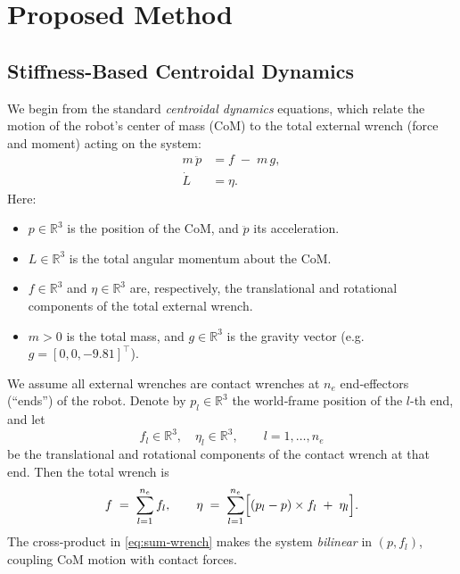 \documentclass[main.tex]{subfiles}
\begin{document}
\section{Proposed Method}\label{sec:proposedmethods}
\subsection{Stiffness-Based Centroidal Dynamics}

We begin from the standard \emph{centroidal dynamics} equations, which relate the motion of the robot’s center of mass (CoM) to the total external wrench (force and moment) acting on the system:
\begin{subequations}\label{eq:centroidal‐dynamics}
\begin{align}
m\,\ddot p &= f \;-\; m\,g, \label{eq:centroidal‐dynamics:trans}\\
\dot L     &= \eta.      \label{eq:centroidal‐dynamics:rot}
\end{align}
\end{subequations}
Here:
\begin{itemize}
  \item $p\in\mathbb{R}^3$ is the position of the CoM, and $\ddot p$ its acceleration.
  \item $L\in\mathbb{R}^3$ is the total angular momentum about the CoM.
  \item $f\in\mathbb{R}^3$ and $\eta\in\mathbb{R}^3$ are, respectively, the translational and rotational components of the total external wrench.
  \item $m>0$ is the total mass, and $g\in\mathbb{R}^3$ is the gravity vector (e.g.\ $g=[0,0,-9.81]^\top$).
\end{itemize}

We assume all external wrenches are contact wrenches at $n_e$ end‐effectors (``ends'') of the robot.  Denote by $p_l\in\mathbb{R}^3$ the world‐frame position of the $l$-th end, and let
\[
f_l\in\mathbb{R}^3,\quad
\eta_l\in\mathbb{R}^3,\qquad l=1,\dots,n_e
\]
be the translational and rotational components of the contact wrench at that end.  Then the total wrench is
\begin{equation}\label{eq:sum‐wrench}
f    \;=\;\sum_{l=1}^{n_e} f_l,
\qquad
\eta \;=\;\sum_{l=1}^{n_e}\Bigl[(p_l - p)\times f_l \;+\;\eta_l\Bigr].
\end{equation}
The cross‐product in \eqref{eq:sum‐wrench} makes the system \emph{bilinear} in $(p,f_l)$, coupling CoM motion with contact forces.

\medskip
\end{document}
